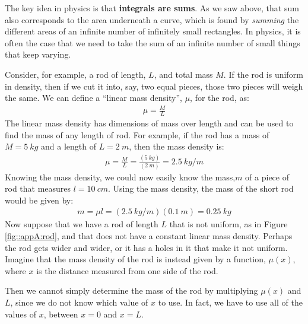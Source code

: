 The key idea in physics is that \textbf{integrals are sums}. As we saw above, that sum also corresponds to the area underneath a curve, which is found by \textit{summing} the different areas of an infinite number of infinitely small rectangles. In physics, it is often the case that we need to take the sum of an infinite number of small things that keep varying. 

Consider, for example, a rod of length, $L$, and total mass $M$. If the rod is uniform in density, then if we cut it into, say, two equal pieces, those two pieces will weigh the same. We can define a ``linear mass density'', $\mu$, for the rod, as:
\begin{align*}
\mu = \frac{M}{L}
\end{align*} 
The linear mass density has dimensions of mass over length and can be used to find the mass of any length of rod. For example, if the rod has a mass of $M=\SI{5}{kg}$ and a length of $L=\SI{2}{m}$, then the mass density is:
\begin{align*}
\mu=\frac{M}{L}=\frac{(\SI{5}{kg})}{(\SI{2}{m})}=\SI{2.5}{kg/m}
\end{align*}
Knowing the mass density, we could now easily know the mass,$m$ of a piece of rod that measures $l=\SI{10}{cm}$. Using the mass density, the mass of the short rod would be given by:
\begin{align*}
m=\mu l=(\SI{2.5}{kg/m})(\SI{0.1}{m})=\SI{0.25}{kg}
\end{align*}
Now suppose that we have a rod of length $L$ that is not uniform, as in Figure \ref{fig::appA:rod}, and that does not have a constant linear mass density. Perhaps the rod gets wider and wider, or it has a holes in it that make it not uniform. Imagine that the mass density of the rod is instead given by a function, $\mu(x)$, where $x$ is the distance measured from one side of the rod. 


Then we cannot simply determine the mass of the rod by multiplying $\mu(x)$ and $L$, since we do not know which value of $x$ to use. In fact, we have to use all of the values of $x$, between $x=0$ and $x=L$. 

